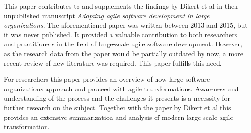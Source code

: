 This paper contributes to and supplements the findings by Dikert et
al in their unpublished manuscript \textit{Adopting agile software
development in large organizations}. The aforementioned paper was
written between 2013 and 2015, but it was never published. It provided a
valuable contribution to both researchers and practitioners in the field
of large-scale agile software development. However, as the research
data from the paper would be partially outdated by now, a more recent
review of new literature was required. This paper fulfills this need.

For researchers this paper provides an overview of how large software
organizations approach and proceed with agile transformations. Awareness
and understanding of the process and the challenges it presents is a
necessity for further research on the subject. Together with the paper
by Dikert et al this provides an extensive summarization and analysis of
modern large-scale agile transformation.
